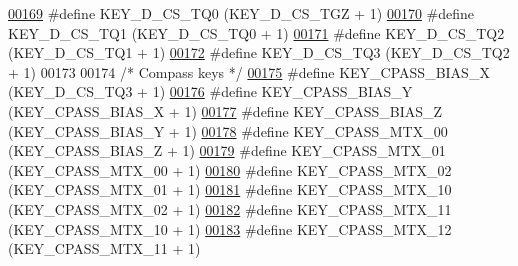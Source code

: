 \begin{DoxyCode}
\hypertarget{dmp_key_8h_source.tex_l00169}{}\hyperlink{dmp_key_8h_a6153e0a0b75906eb642386010662852d}{00169} \textcolor{preprocessor}{#define KEY\_D\_CS\_TQ0                    (KEY\_D\_CS\_TGZ + 1)}
\hypertarget{dmp_key_8h_source.tex_l00170}{}\hyperlink{dmp_key_8h_a107a6b6fcc3d6b96fc2edb0862bf5862}{00170} \textcolor{preprocessor}{#define KEY\_D\_CS\_TQ1                    (KEY\_D\_CS\_TQ0 + 1)}
\hypertarget{dmp_key_8h_source.tex_l00171}{}\hyperlink{dmp_key_8h_a237f4791eec9ec3105994b251c967d92}{00171} \textcolor{preprocessor}{#define KEY\_D\_CS\_TQ2                    (KEY\_D\_CS\_TQ1 + 1)}
\hypertarget{dmp_key_8h_source.tex_l00172}{}\hyperlink{dmp_key_8h_a11f4cdfb5db8624c11a0cedce6d5ce5a}{00172} \textcolor{preprocessor}{#define KEY\_D\_CS\_TQ3                    (KEY\_D\_CS\_TQ2 + 1)}
00173 
00174 \textcolor{comment}{/* Compass keys */}
\hypertarget{dmp_key_8h_source.tex_l00175}{}\hyperlink{dmp_key_8h_a2da3f36266d9b105a92dc81c7b5961ce}{00175} \textcolor{preprocessor}{#define KEY\_CPASS\_BIAS\_X            (KEY\_D\_CS\_TQ3 + 1)}
\hypertarget{dmp_key_8h_source.tex_l00176}{}\hyperlink{dmp_key_8h_a46b38dc4a2ff0c9b823218316f80ed6f}{00176} \textcolor{preprocessor}{#define KEY\_CPASS\_BIAS\_Y            (KEY\_CPASS\_BIAS\_X + 1)}
\hypertarget{dmp_key_8h_source.tex_l00177}{}\hyperlink{dmp_key_8h_a9b42236436c858d2de49063bc0c2465f}{00177} \textcolor{preprocessor}{#define KEY\_CPASS\_BIAS\_Z            (KEY\_CPASS\_BIAS\_Y + 1)}
\hypertarget{dmp_key_8h_source.tex_l00178}{}\hyperlink{dmp_key_8h_abe89c3a827ff9493140eaa27aef71933}{00178} \textcolor{preprocessor}{#define KEY\_CPASS\_MTX\_00            (KEY\_CPASS\_BIAS\_Z + 1)}
\hypertarget{dmp_key_8h_source.tex_l00179}{}\hyperlink{dmp_key_8h_acfc365e5be51d99a6c34421908dc1861}{00179} \textcolor{preprocessor}{#define KEY\_CPASS\_MTX\_01            (KEY\_CPASS\_MTX\_00 + 1)}
\hypertarget{dmp_key_8h_source.tex_l00180}{}\hyperlink{dmp_key_8h_aa952b7623929bd6bb0b1373ff9834752}{00180} \textcolor{preprocessor}{#define KEY\_CPASS\_MTX\_02            (KEY\_CPASS\_MTX\_01 + 1)}
\hypertarget{dmp_key_8h_source.tex_l00181}{}\hyperlink{dmp_key_8h_a8c65416f2758458dd5fd3a3bd1846813}{00181} \textcolor{preprocessor}{#define KEY\_CPASS\_MTX\_10            (KEY\_CPASS\_MTX\_02 + 1)}
\hypertarget{dmp_key_8h_source.tex_l00182}{}\hyperlink{dmp_key_8h_ad9d4ff38897023052b584c07634e9997}{00182} \textcolor{preprocessor}{#define KEY\_CPASS\_MTX\_11            (KEY\_CPASS\_MTX\_10 + 1)}
\hypertarget{dmp_key_8h_source.tex_l00183}{}\hyperlink{dmp_key_8h_ab523943c496c23d274804b08edf0c2a0}{00183} \textcolor{preprocessor}{#define KEY\_CPASS\_MTX\_12            (KEY\_CPASS\_MTX\_11 + 1)}

\end{DoxyCode}
